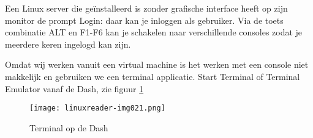 Een Linux server die ge\"installeerd is zonder grafische interface heeft op zijn monitor de prompt Login: daar kan je
inloggen als gebruiker. Via de toets combinatie ALT en F1-F6 kan je schakelen naar verschillende consoles zodat je
meerdere keren ingelogd kan zijn.

Omdat wij werken vanuit een virtual machine is het werken met een console niet makkelijk en gebruiken we een terminal
applicatie. Start Terminal of Terminal Emulator vanaf de Dash, zie figuur \ref{fig:DashTerminal}

\begin{figure}
\texttt{[image: linuxreader-img021.png]}
	\label{fig:DashTerminal}
	\caption{Terminal op de Dash}
\end{figure}


